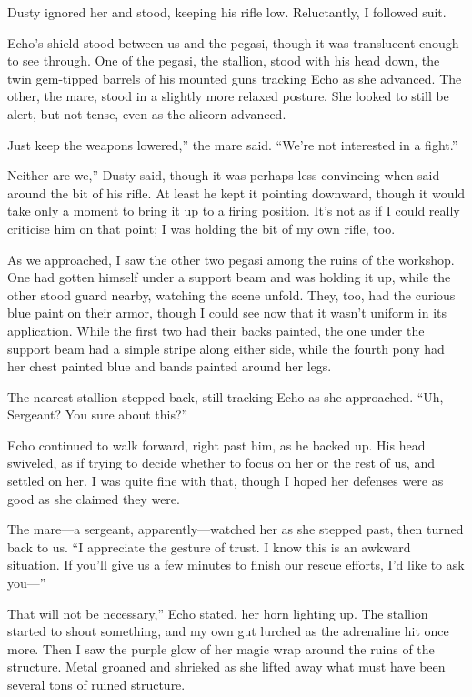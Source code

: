 Dusty ignored her and stood, keeping his rifle low. Reluctantly, I followed suit.

Echo’s shield stood between us and the pegasi, though it was translucent enough to see through. One of the pegasi, the stallion, stood with his head down, the twin gem-tipped barrels of his mounted guns tracking Echo as she advanced. The other, the mare, stood in a slightly more relaxed posture. She looked to still be alert, but not tense, even as the alicorn advanced.

\leavevmode{}Just keep the weapons lowered,” the mare said. “We’re not interested in a fight.”

\leavevmode{}Neither are we,” Dusty said, though it was perhaps less convincing when said around the bit of his rifle. At least he kept it pointing downward, though it would take only a moment to bring it up to a firing position. It’s not as if I could really criticise him on that point; I was holding the bit of my own rifle, too.

As we approached, I saw the other two pegasi among the ruins of the workshop. One had gotten himself under a support beam and was holding it up, while the other stood guard nearby, watching the scene unfold. They, too, had the curious blue paint on their armor, though I could see now that it wasn’t uniform in its application. While the first two had their backs painted, the one under the support beam had a simple stripe along either side, while the fourth pony had her chest painted blue and bands painted around her legs.

The nearest stallion stepped back, still tracking Echo as she approached. “Uh, Sergeant? You sure about this?”

Echo continued to walk forward, right past him, as he backed up. His head swiveled, as if trying to decide whether to focus on her or the rest of us, and settled on her. I was quite fine with that, though I hoped her defenses were as good as she claimed they were.

The mare—a sergeant, apparently—watched her as she stepped past, then turned back to us. “I appreciate the gesture of trust. I know this is an awkward situation. If you’ll give us a few minutes to finish our rescue efforts, I’d like to ask you—”

\leavevmode{}That will not be necessary,” Echo stated, her horn lighting up. The stallion started to shout something, and my own gut lurched as the adrenaline hit once more. Then I saw the purple glow of her magic wrap around the ruins of the structure. Metal groaned and shrieked as she lifted away what must have been several tons of ruined structure.

